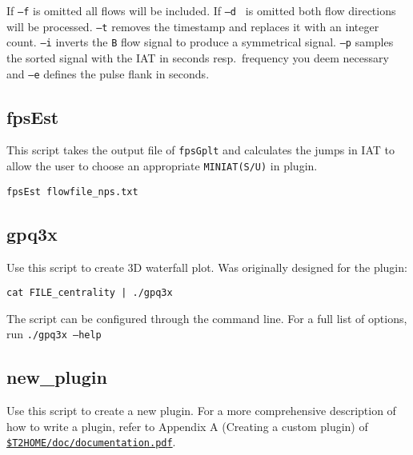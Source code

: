 \documentclass[documentation]{subfiles}
\begin{document}
If {\tt --f} is omitted all flows will be included.
If {\tt --d } is omitted both flow directions will be processed.
{\tt --t} removes the timestamp and replaces it with an integer count.
{\tt --i} inverts the {\tt B} flow signal to produce a symmetrical signal.
{\tt --p} samples the sorted signal with the IAT in seconds resp.\ frequency you deem necessary and {\tt --e} defines the pulse flank in seconds.

\subsection{fpsEst}
This script takes the output file of {\tt fpsGplt} and calculates the jumps in IAT to allow the user to choose an appropriate {\tt MINIAT(S/U)} in  plugin.

\begin{center}
    {\tt fpsEst flowfile\_nps.txt }
\end{center}


\subsection{gpq3x}
Use this script to create 3D waterfall plot.
Was originally designed for the  plugin:
\begin{center}
    {\tt cat FILE\_centrality | ./gpq3x}
\end{center}
The script can be configured through the command line.
For a full list of options, run {\tt ./gpq3x --help}

\subsection{new\_plugin}\label{scripts:new_plugin}
Use this script to create a new plugin.
For a more comprehensive description of how to write a plugin, refer to Appendix A (Creating a custom plugin) of \href{../../doc/documentation.pdf}{\tt \$T2HOME/doc/documentation.pdf}.
\end{document}
